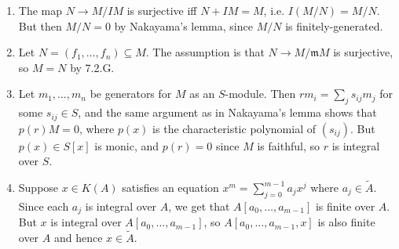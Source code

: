 \documentclass{report}
\newcommand{\intClosure}[1]{\widetilde{#1}} %
\newcommand{\m}{\mathfrak{m}}
\DeclareMathOperator{\Spec}{Spec}
\begin{document}
\begin{enumerate}[label=\textbf{7.2.\Alph*.}]
\begin{enumerate}[label=(\alph*)]
\begin{center}
		            \end{center}
	      \end{enumerate}

	\item The map $N\to M/IM$ is surjective iff $N+IM=M$, i.e. $I(M/N)=M/N$. But
	      then $M/N=0$ by Nakayama's lemma, since $M/N$ is finitely-generated.

	\item Let $N=(f_1,\ldots,f_n)\subseteq M$. The assumption is that
	      $N\to M/\m M$ is surjective, so $M=N$ by 7.2.G.

	\item Let $m_1,\ldots,m_n$ be generators for $M$ as an $S$-module. Then
	      $rm_i=\sum_js_{ij}m_j$ for some $s_{ij}\in S$, and the same argument as
	      in Nakayama's lemma shows that $p(r)M=0$, where $p(x)$ is the
	      characteristic polynomial of $(s_{ij})$. But $p(x)\in S[x]$ is monic,
	      and $p(r)=0$ since $M$ is faithful, so $r$ is integral over $S$.

	\item Suppose $x\in K(A)$ satisfies an equation $x^m=\sum_{j=0}^{m-1}a_jx^j$
	      where $a_j\in\intClosure A$. Since each $a_j$ is integral over $A$, we
	      get that $A[a_0,\ldots,a_{m-1}]$ is finite over $A$. But $x$ is integral
	      over $A[a_0,\ldots,a_{m-1}]$, so $A[a_0,\ldots,a_{m-1},x]$ is also
	      finite over $A$ and hence $x\in\intClosure A$.
\end{enumerate}
\end{document}
